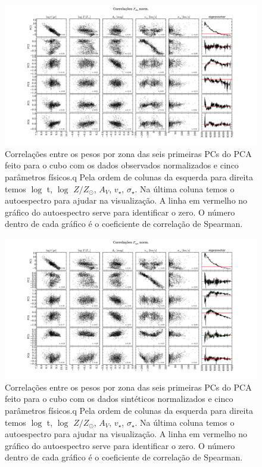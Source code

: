 \begin{figure}
    \includegraphics[width=1.3\textwidth, angle=-90]{figuras/K0277-correl-f_obs_norm-PCvsPhys.pdf}
	\caption[Correlações PCs vs. par\^ametros f\'isicos - $F_{obs}$ norm.]
    {Correlações entre os pesos por zona das seis primeiras PCs do PCA feito para o cubo com os dados observados
    normalizados e cinco parâmetros físicos.q Pela ordem de colunas da esquerda para direita temos $\log$ t, $\log$ $Z /
    Z_{\odot}$, $A_V$, $v_{\star}$, $\sigma_{\star}$. Na última coluna temos o autoespectro para ajudar na visualização.
    A linha em vermelho no gráfico do autoespectro serve para identificar o zero. O número dentro de cada gráfico é o
    coeficiente de correlação de Spearman.}
    \label{fig:K0277correfobsnorm}
\end{figure}

\begin{figure}
    \includegraphics[width=1.3\textwidth, angle=-90]{figuras/K0277-correl-f_syn_norm-PCvsPhys.pdf}
	\caption[Correlações PCs vs. par\^ametros f\'isicos - $F_{syn}$ norm.]
    {Correlações entre os pesos por zona das seis primeiras PCs do PCA feito para o cubo com os dados sintéticos
    normalizados e cinco parâmetros físicos.q Pela ordem de colunas da esquerda para direita temos $\log$ t, $\log$ $Z /
    Z_{\odot}$, $A_V$, $v_{\star}$, $\sigma_{\star}$. Na última coluna temos o autoespectro para ajudar na visualização.
    A linha em vermelho no gráfico do autoespectro serve para identificar o zero. O número dentro de cada gráfico é o
    coeficiente de correlação de Spearman.}
    \label{fig:K0277correfsynorm}
\end{figure}

